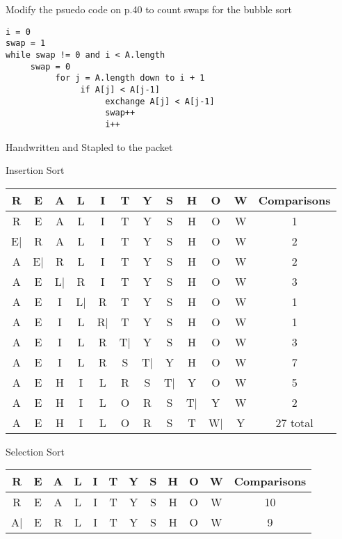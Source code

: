 \documentclass[12pt,largemargins]{homework}
\begin{document}
\question
Modify the psuedo code on p.40 to count swaps for the bubble sort
\begin{verbatim}
i = 0
swap = 1
while swap != 0 and i < A.length
     swap = 0
          for j = A.length down to i + 1
               if A[j] < A[j-1]
                    exchange A[j] < A[j-1]
                    swap++
                    i++ 
\end{verbatim}

\question
	Handwritten and Stapled to the packet
	\begin{alphaparts}
	\item
	Insertion Sort
	\begin{center}
		\begin{tabular}{c c c c c c c c c c c c}
		\hline
		R & E & A & L & I & T & Y & S & H & O & W & Comparisons\\
		\hline
		R & E & A & L & I & T & Y & S & H & O & W & 1\\
		\hline
		E| & R & A & L & I & T & Y & S & H & O & W & 2 \\
		\hline
		A & E| & R & L & I & T & Y & S & H & O & W & 2 \\
		\hline
		A & E & L| & R & I & T & Y& S & H & O & W & 3 \\
		\hline
		A & E & I & L| & R & T & Y & S & H & O & W & 1 \\
		\hline
		A & E & I & L & R| & T & Y & S & H & O & W & 1 \\
		\hline
		A & E & I & L & R & T| & Y & S & H & O & W & 3 \\
		\hline
		A & E & I & L & R & S & T| & Y & H & O & W & 7 \\
		\hline
		A & E & H & I & L & R & S & T| &  Y  & O & W & 5 \\
		\hline
		A & E & H & I & L & O & R & S & T| &  Y  & W & 2 \\
		\hline
		A & E & H & I & L & O & R & S & T &  W|  & Y & 27 total \\
		\end{tabular}
	\end{center}
	\newpage
	\item
	Selection Sort
	\begin{center}
		\begin{tabular}{c c c c c c c c c c c c}
		\hline
		R & E & A & L & I & T & Y & S & H & O & W & Comparisons\\
		\hline
		R & E & A & L & I & T & Y & S & H & O & W & 10\\
		\hline
		A| & E & R & L & I & T & Y & S & H & O & W & 9\\

\end{tabular}
\end{center}
\end{alphaparts}
\end{document}
